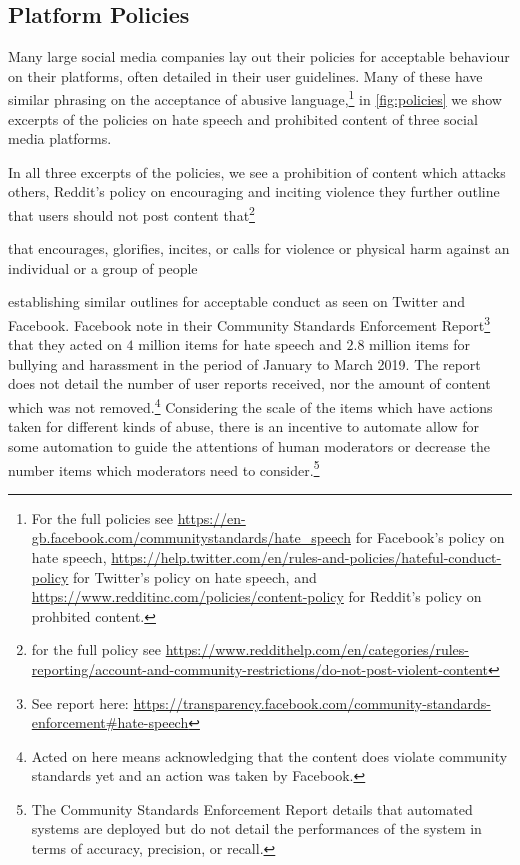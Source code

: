 \subsection{Platform Policies}

Many large social media companies lay out their policies for acceptable behaviour on their platforms, often detailed in their user guidelines. Many of these have similar phrasing on the acceptance of abusive language,\footnote{For the full policies see \url{https://en-gb.facebook.com/communitystandards/hate_speech} for Facebook's policy on hate speech, \url{https://help.twitter.com/en/rules-and-policies/hateful-conduct-policy} for Twitter's policy on hate speech, and \url{https://www.redditinc.com/policies/content-policy} for Reddit's policy on prohbited content.} in \autoref{fig:policies} we show excerpts of the policies on hate speech and prohibited content of three social media platforms.

In all three excerpts of the policies, we see a prohibition of content which attacks others, Reddit's policy on encouraging and inciting violence they further outline that users should not post content that\footnote{for the full policy see \url{https://www.reddithelp.com/en/categories/rules-reporting/account-and-community-restrictions/do-not-post-violent-content}}

\begin{aquote}
  [\dots] that encourages, glorifies, incites, or calls for violence or physical harm against an individual or a group of people
\end{aquote}

establishing similar outlines for acceptable conduct as seen on Twitter and Facebook. Facebook note in their Community Standards Enforcement Report\footnote{See report here: \url{https://transparency.facebook.com/community-standards-enforcement\#hate-speech}} that they acted on $4$ million items for hate speech and $2.8$ million items for bullying and harassment in the period of January to March 2019. The report does not detail the number of user reports received, nor the amount of content which was not removed.\footnote{Acted on here means acknowledging that the content does violate community standards yet and an action was taken by Facebook.} Considering the scale of the items which have actions taken for different kinds of abuse, there is an incentive to automate allow for some automation to guide the attentions of human moderators or decrease the number items which moderators need to consider.\footnote{The Community Standards Enforcement Report details that automated systems are deployed but do not detail the performances of the system in terms of accuracy, precision, or recall.}

